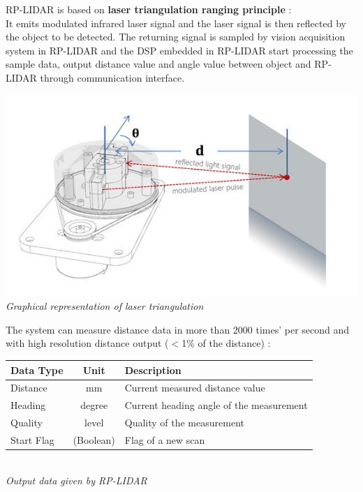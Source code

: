 \documentclass[10pt,a4paper]{article}
\begin{document}
RP-LIDAR is based on \textbf{laser triangulation ranging principle} :\\
It emits modulated infrared laser signal and the laser signal is then reflected by the object to be detected. The returning signal is sampled by vision acquisition system in RP-LIDAR and the DSP embedded in RP-LIDAR start processing the sample data, output distance value and angle value between object and RP-LIDAR through communication interface.\\

\begin{center}
\includegraphics[scale=0.6]{images/robopeak-sensor.jpg}\\
\textit{Graphical representation of laser triangulation}
\end{center}

The system can measure distance data in more than 2000 times' per second and with high resolution distance output ($<$1\% of the distance) :\\

\begin{center}
\begin{tabular}{|l|c|l|}
\hline
Data Type & Unit & Description\\
\hline
Distance & mm & Current measured distance value\\
Heading & degree & Current heading angle of the measurement \\
Quality & level & Quality of the measurement\\
Start Flag & 	(Boolean) & Flag of a new scan\\
\hline
\end{tabular}\\

\textit{Output data given by RP-LIDAR}
\end{center}
\end{document}
